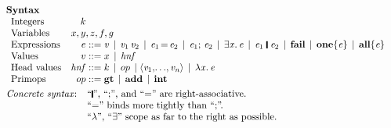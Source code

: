 \documentclass[acmsmall,review,dvipsnames]{acmart}
\newcommand{\Varid}[1]{\mathit{#1}}
\newcommand{\vb}{\; \ensuremath{\mathop{\mid}} \;}    %
\newcommand{\freevars}[1]{\mathsf{fvs}(#1)}
\newcommand{\hnf}{\mathit{hnf}}  %
\begin{document}
\begin{figure}
  $$
  \begin{array}{l}
    \textbf{Syntax} \\
    \begin{array}{lr@{\;}r@{\;}l}
    \text{Integers} & k \\
    \text{Variables} & \multicolumn{3}{l}{x,y,z,f,g} \\
    \text{Expressions} & e  & ::=  & \ensuremath{\Varid{v}} \vb \ensuremath{\Varid{v}_{\mathrm{1}}\,\Varid{v}_{\mathrm{2}}}
       \vb \ensuremath{\Varid{e}_{\mathrm{1}}\hspace{-0.14em}=\hspace{-0.14em}\Varid{e}_{\mathrm{2}}} \vb \ensuremath{\Varid{e}_{\mathrm{1}};\,\Varid{e}_{\mathrm{2}}} \vb  \ensuremath{\exists\Varid{x}.\,\Varid{e}}
       \vb \ensuremath{\Varid{e}_{\mathrm{1}}\;\rule[-0.1em]{0.15em}{0.75em}\;\Varid{e}_{\mathrm{2}}} \vb \ensuremath{\textbf{fail}} \vb \ensuremath{\textbf{one}\{\Varid{e}\}} \vb \ensuremath{\textbf{all}\{\Varid{e}\}} \\
    \text{Values} & v & ::= & x  \vb \hnf \\
    \text{Head values} & \hnf & ::= & k \vb op \vb \ensuremath{\langle\Varid{v}_{\mathrm{1}},\!\ldots\!,\Varid{v}_{\Varid{n}}\rangle} \vb \ensuremath{\lambda\Varid{x}.\,\Varid{e}} \\
    \text{Primops} & op  & ::= & \ensuremath{\textbf{gt}} \vb \ensuremath{\textbf{add}} \vb \ensuremath{\textbf{int}}
    \end{array} \\
    \\[-3mm]
    \text{\emph{Concrete syntax}:} \;\;
    \begin{array}[t]{l}
          \text{``\ensuremath{\rule[-0.1em]{0.15em}{0.75em}}'', ``;'', and ``\ensuremath{\mathrel{=}}'' are right-associative.} \\
          \text{``\ensuremath{\mathrel{=}}'' binds more tightly than ``;''.} \\
          \text{``$\lambda$'', ``\ensuremath{\exists{}}'' scope as far to the right as possible.} \\

\end{array}
\end{array}$$
\end{figure}
\end{document}
